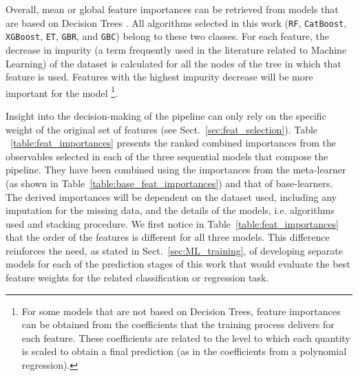 \documentclass{aa}
\begin{document}
Overall, mean or global feature importances can be retrieved from models that are based on Decision Trees \citep[e.g. Random Forests and Boosting models,][]{Breiman2001, breiman2003manual}. All algorithms selected in this work (\verb|RF|, \verb|CatBoost|, \verb|XGBoost|, \verb|ET|, \verb|GBR|, and \verb|GBC|) belong to these two classes. For each feature, the decrease in impurity (a term frequently used in the literature related to Machine Learning) of the dataset is calculated for all the nodes of the tree in which that feature is used. Features with the highest impurity decrease will be more important for the model \citep{NIPS2013_e3796ae8}\footnote{For some models that are not based on Decision Trees, feature importances can be obtained from the coefficients that the training process delivers for each feature. These coefficients are related to the level to which each quantity is scaled to obtain a final prediction (as in the coefficients from a polynomial regression).}.

Insight into the decision-making of the pipeline can only rely on the specific weight of the original set of features (see Sect.~\ref{sec:feat_selection}). Table ~\ref{table:feat_importances} presents the ranked combined importances from the observables selected in each of the three sequential models that compose the pipeline. They have been combined using the importances from the meta-learner (as shown in Table~\ref{table:base_feat_importances}) and that of base-learners. The derived importances will be dependent on the dataset used, including any imputation for the missing data, and the details of the models, i.e. algorithms used and stacking procedure. 
We first notice in Table~\ref{table:feat_importances} that the order of the features is different for all three models. This difference reinforces the need, as stated in Sect.~\ref{sec:ML_training}, of developing separate models for each of the prediction stages of this work that would evaluate the best feature weights for the related classification or regression task. 
\end{document}
